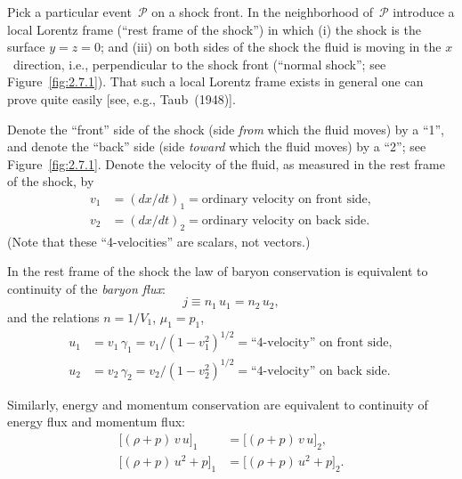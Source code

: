 \medskip
\noindent
Pick a particular event~$\mathscr{P}$ on a shock front.  In the neighborhood
of~$\mathscr{P}$ introduce a local Lorentz frame (``rest frame of the shock'')
in which (i) the shock is the surface $y = z = 0$; and (iii) on both sides of
the shock the fluid is moving in the $x$~direction, i.e., perpendicular to the
shock front (``normal shock''; see Figure~\ref{fig:2.7.1}).  That such a local
Lorentz frame exists in general one can prove quite easily [see, e.g.,
Taub~(1948)].

Denote the ``front'' side of the shock (side \emph{from} which the fluid moves)
by a ``1'', and denote the ``back'' side (side \emph{toward} which the fluid
moves) by a ``2''; see Figure~\ref{fig:2.7.1}.  Denote the velocity of the
fluid, as measured in the rest frame of the shock, by
%
\begin{subequations}
\begin{align}
\tag{2.7.1a}
v_1 &= (dx/dt)_1 = \text{ordinary velocity on front side},\\[4pt]
\tag{2.7.1b}
v_2 &= (dx/dt)_2 = \text{ordinary velocity on back side}.
\end{align}
\end{subequations}
%
(Note that these ``4-velocities'' are scalars, not vectors.)

In the rest frame of the shock the law of baryon conservation is equivalent
to continuity of the \emph{baryon flux}:
%
\begin{equation}
\tag{2.7.2a}
j \equiv n_1\,u_1 = n_2\,u_2,
\end{equation}
%
and the relations $n = 1/V_1$, $\mu_1 = p_1$,
%
\begin{subequations}
\begin{align}
\tag{2.7.1c}
u_1 &= v_1\,\gamma_1 = v_1/(1 - v_1^2)^{1/2}
  = \text{``4-velocity'' on front side},\\[4pt]
\tag{2.7.1d}
u_2 &= v_2\,\gamma_2 = v_2/(1 - v_2^2)^{1/2}
  = \text{``4-velocity'' on back side}.
\end{align}
\end{subequations}

\noindent
Similarly, energy and momentum conservation are equivalent to continuity of
energy flux and momentum flux:
%
\begin{subequations}
\begin{align}
\tag{2.7.2b}
\bigl[(\rho + p)\,v\,u\bigr]_1
  &= \bigl[(\rho + p)\,v\,u\bigr]_2,\\[4pt]
\tag{2.7.2c}
\bigl[(\rho + p)\,u^2 + p\bigr]_1
  &= \bigl[(\rho + p)\,u^2 + p\bigr]_2.
\end{align}
\end{subequations}

